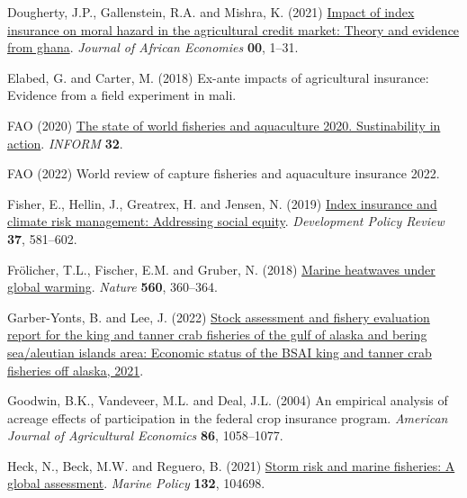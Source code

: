 \documentclass[
  letterpaper,
  DIV=11,
  numbers=noendperiod]{scrartcl}
\newlength{\cslhangindent}
\newlength{\cslentryspacingunit} %
\newenvironment{CSLReferences}[2] %
 {%
  \setlength{\parindent}{0pt}
  \ifodd #1
  \let\oldpar\par
  \def\par{\hangindent=\cslhangindent\oldpar}
  \fi
  \setlength{\parskip}{#2\cslentryspacingunit}
 }%
 {}
\theoremstyle{plain}
\theoremstyle{plain}
\theoremstyle{remark}
\begin{document}
\begin{CSLReferences}{1}{0}
\leavevmode{}%
Dougherty, J.P., Gallenstein, R.A. and Mishra, K. (2021)
\href{https://doi.org/10.1093/jafeco/ejab003}{Impact of index insurance
on moral hazard in the agricultural credit market: Theory and evidence
from ghana}. \emph{Journal of African Economies} \textbf{00}, 1--31.

\leavevmode{}%
Elabed, G. and Carter, M. (2018) Ex-ante impacts of agricultural
insurance: Evidence from a field experiment in mali.

\leavevmode{}%
FAO (2020) \href{https://doi.org/10.4060/ca9229en}{The state of world
fisheries and aquaculture 2020. Sustinability in action}. \emph{INFORM}
\textbf{32}.

\leavevmode{}%
FAO (2022) World review of capture fisheries and aquaculture insurance
2022.

\leavevmode{}%
Fisher, E., Hellin, J., Greatrex, H. and Jensen, N. (2019)
\href{https://doi.org/10.1111/dpr.12387}{Index insurance and climate
risk management: Addressing social equity}. \emph{Development Policy
Review} \textbf{37}, 581--602.

\leavevmode{}%
Frölicher, T.L., Fischer, E.M. and Gruber, N. (2018)
\href{https://doi.org/10.1038/s41586-018-0383-9}{Marine heatwaves under
global warming}. \emph{Nature} \textbf{560}, 360--364.

\leavevmode{}%
Garber-Yonts, B. and Lee, J. (2022)
\href{http://www.afsc.noaa.gov/refm/Socioeconomics/SAFE/default.php}{Stock
assessment and fishery evaluation report for the king and tanner crab
fisheries of the gulf of alaska and bering sea/aleutian islands area:
Economic status of the BSAI king and tanner crab fisheries off alaska,
2021}.

\leavevmode{}%
Goodwin, B.K., Vandeveer, M.L. and Deal, J.L. (2004) An empirical
analysis of acreage effects of participation in the federal crop
insurance program. \emph{American Journal of Agricultural Economics}
\textbf{86}, 1058--1077.

\leavevmode{}%
Heck, N., Beck, M.W. and Reguero, B. (2021)
\href{https://doi.org/10.1016/j.marpol.2021.104698}{Storm risk and
marine fisheries: A global assessment}. \emph{Marine Policy}
\textbf{132}, 104698.


\end{CSLReferences}
\end{document}
